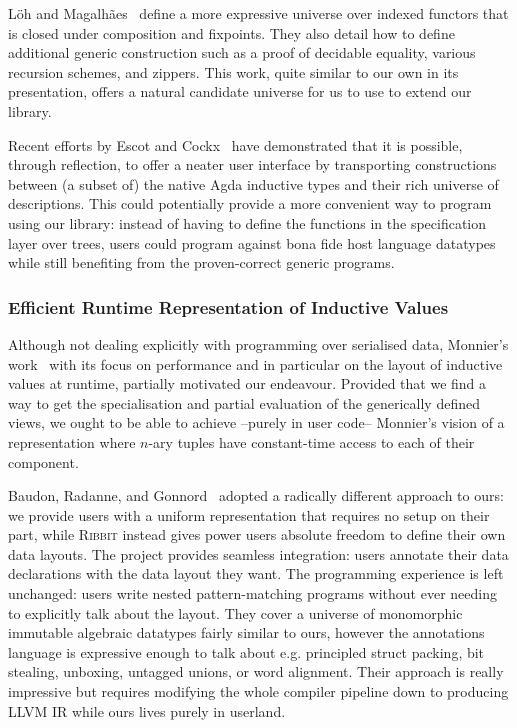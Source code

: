 L{\"{o}}h and Magalh{\~{a}}es~\citeyearpar{DBLP:conf/icfp/LohM11} define a more
expressive universe over indexed functors that is closed under composition
and fixpoints.
%
They also detail how to define additional generic construction such as a
proof of decidable equality, various recursion schemes, and zippers.
%
This work, quite similar to our own in its presentation, offers a natural
candidate universe for us to use to extend our library.

Recent efforts by Escot and Cockx~\citeyearpar{DBLP:journals/pacmpl/EscotC22}
have demonstrated that it is possible, through reflection, to offer
a neater user interface by transporting constructions between (a subset of)
the native Agda inductive types and their rich universe of descriptions.
%
This could potentially provide a more convenient way to program using
our library: instead of having to define the functions in the specification
layer over  trees, users could program against bona fide
host language datatypes while still benefiting from the proven-correct
generic programs.

\subsubsection{Efficient Runtime Representation of Inductive Values}

Although not dealing explicitly with programming over serialised data,
Monnier's work~\citeyearpar{DBLP:conf/icfp/Monnier19} with its focus on performance and
in particular on the layout of inductive values at runtime,
partially motivated our endeavour.
%
Provided that we find a way to get the specialisation and partial evaluation
of the generically defined views, we ought to be able to achieve --purely in
user code-- Monnier's vision of a representation where $n$-ary tuples have
constant-time access to each of their component.

Baudon, Radanne, and Gonnord~\citeyearpar{ACM:conf/icfp/Baudon23} adopted
a radically different approach to ours: we provide users with a
uniform representation that requires no setup on their part,
while \textsc{Ribbit} instead gives power users absolute freedom
to define their own data layouts.
%
The project provides seamless integration: users annotate their
data declarations with the data layout they want.
%
The programming experience is left unchanged: users write nested
pattern-matching programs without ever needing to explicitly talk
about the layout.
%
They cover a universe of monomorphic immutable algebraic datatypes
fairly similar to ours, however the annotations language is expressive
enough to talk about e.g. principled struct packing, bit stealing,
unboxing, untagged unions, or word alignment.
%
Their approach is really impressive but requires modifying the
whole compiler pipeline down to producing LLVM IR while ours
lives purely in userland.


